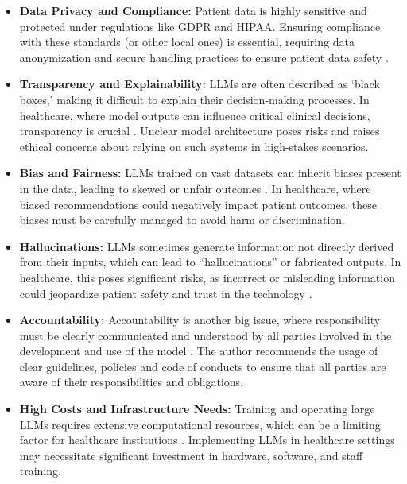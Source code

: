 \begin{itemize}
    \item \textbf{Data Privacy and Compliance:} Patient data is highly sensitive and protected under regulations like GDPR and HIPAA. Ensuring compliance with these standards (or other local ones) is essential, requiring data anonymization and secure handling practices to ensure patient data safety \parencite{llm_healthcare,llm_healthcare2,llm_healthcare4}.
    \item \textbf{Transparency and Explainability:} LLMs are often described as ‘black boxes,’ making it difficult to explain their decision-making processes. In healthcare, where model outputs can influence critical clinical decisions, transparency is crucial \parencite{llm_healthcare,llm_healthcare2,llm_healthcare4}. Unclear model architecture poses risks and raises ethical concerns about relying on such systems in high-stakes scenarios.
    \item \textbf{Bias and Fairness:} LLMs trained on vast datasets can inherit biases present in the data, leading to skewed or unfair outcomes \parencite{llm_healthcare2}. In healthcare, where biased recommendations could negatively impact patient outcomes, these biases must be carefully managed to avoid harm or discrimination.
    \item \textbf{Hallucinations:} LLMs sometimes generate information not directly derived from their inputs, which can lead to “hallucinations” or fabricated outputs. In healthcare, this poses significant risks, as incorrect or misleading information could jeopardize patient safety and trust in the technology \parencite{llm_healthcare4,llm_healthcare}.
    \item \textbf{Accountability:} Accountability is another big issue, where responsibility must be clearly communicated and understood by all parties involved in the development and use of the model \parencite{llm_healthcare2}. The author recommends the usage of clear guidelines, policies and code of conducts to ensure that all parties are aware of their responsibilities and obligations.
    \item \textbf{High Costs and Infrastructure Needs:} Training and operating large LLMs requires extensive computational resources, which can be a limiting factor for healthcare institutions \parencite{llm_healthcare4}. Implementing LLMs in healthcare settings may necessitate significant investment in hardware, software, and staff training.
\end{itemize}

